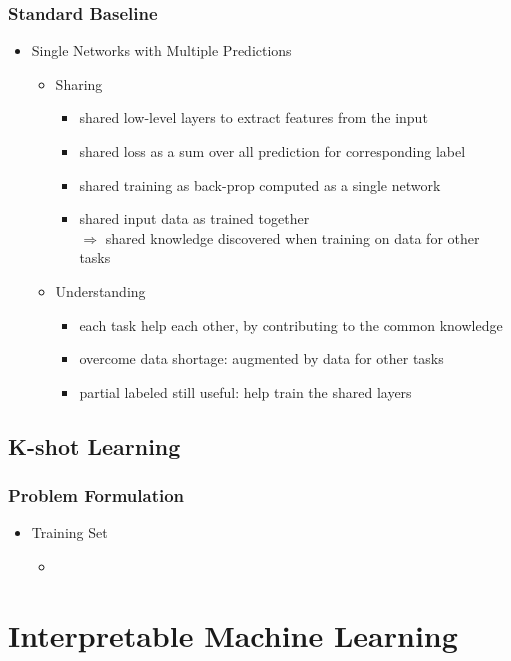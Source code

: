 \subsubsection{Standard Baseline}
\begin{itemize}
\item Single Networks with Multiple Predictions
	\begin{itemize}
	\item Sharing
		\begin{itemize}
		\item shared low-level layers to extract features from the input
		\item shared loss as a sum over all prediction for corresponding label
		\item shared training as back-prop computed as a single network
		\item shared input data as trained together \\
		$\Rightarrow$ shared knowledge discovered when training on data for other tasks
		\end{itemize}
	\item Understanding
		\begin{itemize}
		\item each task help each other, by contributing to the common knowledge
		\item overcome data shortage: augmented by data for other tasks
		\item partial labeled still useful: help train the shared layers
		\end{itemize}
	\end{itemize}
\end{itemize}

\subsection{K-shot Learning}
\subsubsection{Problem Formulation}
\begin{itemize}
\item Training Set
	\begin{itemize}
	\item 
	\end{itemize}
\end{itemize}

\section{Interpretable Machine Learning}

